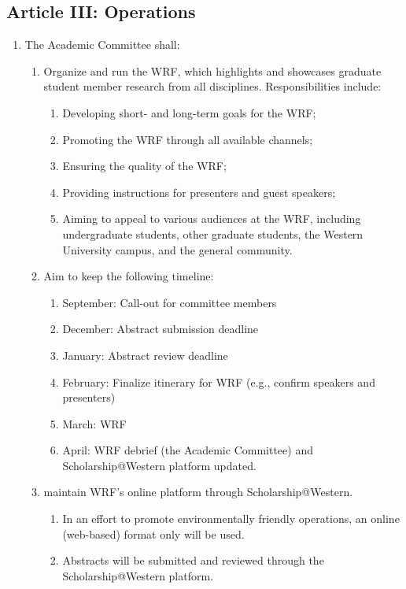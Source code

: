 \subsection{Article III: Operations}
\begin{enumerate}[label*=\arabic*., align=left]	
\item The Academic Committee shall:
\begin{enumerate}[label*=\arabic*., align=left]	
\item Organize and run the WRF, which highlights and showcases graduate student member research from all disciplines. Responsibilities include:
\begin{enumerate}[label*=\arabic*., align=left]
\item Developing short- and long-term goals for the WRF;
\item Promoting the WRF through all available channels;
\item Ensuring the quality of the WRF;
\item Providing instructions for presenters and guest speakers;
\item Aiming to appeal to various audiences at the WRF, including undergraduate students, other graduate students, the Western University campus, and the general community.
\end{enumerate}
\item Aim to keep the following timeline:
\begin{enumerate}[label*=\arabic*., align=left]
\item September: Call-out for committee members 
\item December: Abstract submission deadline
\item January: Abstract review deadline
\item February: Finalize itinerary for WRF (e.g., confirm speakers and presenters)
\item March: WRF
\item April: WRF debrief (the Academic Committee) and Scholarship@Western platform updated.
\end{enumerate}
\item maintain WRF’s online platform through Scholarship@Western.
\begin{enumerate}[label*=\arabic*., align=left]
\item In an effort to promote environmentally friendly operations, an online (web-based) format only will be used.
\item Abstracts will be submitted and reviewed through the Scholarship@Western platform.

\end{enumerate}
\end{enumerate}
\end{enumerate}
